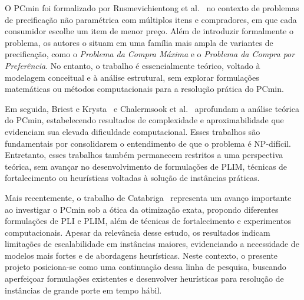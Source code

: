 O PCmin foi formalizado por Rusmevichientong et al.~\cite{rusmevichientong2006} no contexto de problemas de precificação não paramétrica com múltiplos itens e compradores, em que cada consumidor escolhe um item de menor preço. Além de introduzir formalmente o problema, os autores o situam em uma família mais ampla de variantes de precificação, como o \textit{Problema da Compra Máxima} e o \textit{Problema da Compra por Preferência}. No entanto, o trabalho é essencialmente teórico, voltado à modelagem conceitual e à análise estrutural, sem explorar formulações matemáticas ou métodos computacionais para a resolução prática do PCmin.

Em seguida, Briest e Krysta~\cite{briest2007} e Chalermsook et al.~\cite{chalermsook2012} aprofundam a análise teórica do PCmin, estabelecendo resultados de complexidade e aproximabilidade que evidenciam sua elevada dificuldade computacional. Esses trabalhos são fundamentais por consolidarem o entendimento de que o problema é NP-difícil. Entretanto, esses trabalhos também permanecem restritos a uma perspectiva teórica, sem avançar no desenvolvimento de formulações de PLIM, técnicas de fortalecimento ou heurísticas voltadas à solução de instâncias práticas.

Mais recentemente, o trabalho de Catabriga~\cite{catabriga2025} representa um avanço importante ao investigar o PCmin sob a ótica da otimização exata, propondo diferentes formulações de PLI e PLIM, além de técnicas de fortalecimento e experimentos computacionais. Apesar da relevância desse estudo, os resultados indicam limitações de escalabilidade em instâncias maiores, evidenciando a necessidade de modelos mais fortes e de abordagens heurísticas. Neste contexto, o presente projeto posiciona-se como uma continuação dessa linha de pesquisa, buscando aperfeiçoar formulações existentes e desenvolver heurísticas para resolução de instâncias de grande porte em tempo hábil.